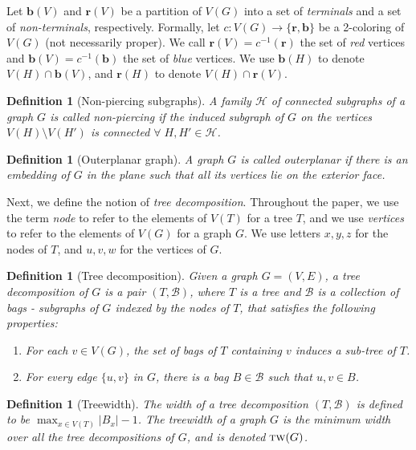 \documentclass[12pt]{article}
\newcommand{\R}{\mathbf{r}}
\newcommand{\B}{\mathbf{b}}
\newcommand{\tw}{\textsc{tw}}
\newtheorem{definition}[theorem]{Definition}
\theoremstyle{case}
\begin{document}
Let $\B(V)$ and $\R(V)$ be a partition of $V(G)$ into a set 
of \emph{terminals} and a set of \emph{non-terminals}, respectively.
Formally, let $c:V(G)\to\{\R,\B\}$ be a 2-coloring of $V(G)$ (not necessarily proper).
We call $\R(V)=c^{-1}(\R)$ the set of \emph{red} vertices and $\B(V)=c^{-1}(\B)$ the set of \emph{blue} vertices.
We use $\B(H)$ to denote $V(H)\cap\B(V)$, and $\R(H)$ to denote $V(H)\cap\R(V)$.

\begin{definition}[Non-piercing subgraphs]\label{def:nonpiercing} A family $\mathcal{H}$ of connected subgraphs of a graph $G$ is called non-piercing if the induced subgraph of $G$ on the vertices $V(H)\setminus V(H')$ is connected $\forall\;H,H'\in\mathcal{H}$.
\end{definition}

\begin{definition}[Outerplanar graph]
A graph $G$ is called outerplanar if there is an embedding of $G$ in the plane such that all its vertices lie on the exterior face.
\end{definition}

Next, we define the notion of \emph{tree decomposition}.
Throughout the paper, we use the term \emph{node} to refer to the elements of $V(T)$ for a tree $T$, and we use \emph{vertices} to refer to the elements of $V(G)$ for a graph $G$.
We use letters $x,y,z$ for the nodes of $T$, and $u,v,w$ for the vertices of $G$.

\begin{definition}[Tree decomposition] Given a graph $G=(V,E)$, a tree decomposition of $G$ is a pair $(T,\mathcal{B})$, 
where $T$ is a tree and $\mathcal{B}$ is a collection of \emph{bags} - subgraphs of $G$ indexed by the nodes of $T$, that satisfies the following properties:
\begin{enumerate}
    \item For each $v\in V(G)$, the set of bags of $T$ containing $v$ induces a sub-tree of $T$.
    \item For every edge $\{u,v\}$ in $G$, there is a bag $B\in\mathcal{B}$ such that $u,v\in B$.
\end{enumerate}
\end{definition}
\begin{definition}[Treewidth]
The width of a tree decomposition $(T,\mathcal{B})$ is defined to be   $\max_{x\in V(T)} |B_x|-1$.
The treewidth of a graph $G$ is the minimum width over all the tree decompositions of $G$, and is denoted $\tw(G)$. 
\end{definition}
\end{document}
